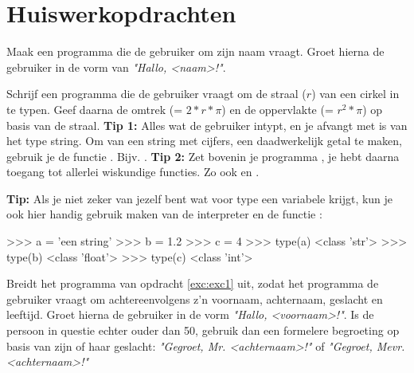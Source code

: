 \section{Huiswerkopdrachten}
\begin{exercise} \label{exc:exc1}
Maak een programma die de gebruiker om zijn naam vraagt. Groet hierna de gebruiker in de vorm van \textit{"Hallo, <naam>!"}.
\end{exercise}

\begin{exercise}
Schrijf een programma die de gebruiker vraagt om de straal ($r$) van een cirkel in te typen. Geef daarna de omtrek (= $2*r*\pi$) en de oppervlakte (= $r^2*\pi$) op basis van de straal. \newline \newline
\textbf{Tip 1:} Alles wat de gebruiker intypt, en je afvangt met  is van het type string. Om van een string met cijfers, een daadwerkelijk getal te maken, gebruik je de functie . Bijv. .\newline \newline
\textbf{Tip 2:} Zet bovenin je programma , je hebt daarna toegang tot allerlei wiskundige functies. Zo ook  en .
\end{exercise}

\begin{remark}
\textbf{Tip:} Als je niet zeker van jezelf bent wat voor type een variabele krijgt, kun je ook hier handig gebruik maken van de interpreter en de functie :
\begin{python}
>>> a = 'een string'
>>> b = 1.2
>>> c = 4
>>> type(a)
<class 'str'>
>>> type(b)
<class 'float'>
>>> type(c)
<class 'int'>
\end{python}
\end{remark}

\begin{exercise}
Breidt het programma van opdracht \ref{exc:exc1} uit, zodat het programma de gebruiker vraagt om achtereenvolgens z'n voornaam, achternaam, geslacht en leeftijd. \newline
Groet hierna de gebruiker in de vorm \textit{"Hallo, <voornaam>!"}. \newline
Is de persoon in questie echter ouder dan 50, gebruik dan een formelere begroeting op basis van zijn of haar geslacht: \textit{"Gegroet, Mr. <achternaam>!"} of \textit{"Gegroet, Mevr. <achternaam>!"}
\end{exercise}

